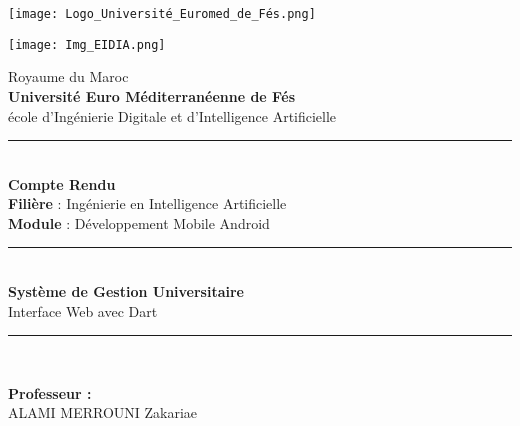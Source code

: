 \documentclass{article}
\begin{document}
\begin{titlepage}
    \begin{center}
        \begin{minipage}{0.45\textwidth}
            \texttt{[image: Logo\_Université\_Euromed\_de\_Fés.png]}
        \end{minipage}%
        \hfill
        \begin{minipage}{0.45\textwidth}
            \begin{flushright}
                \texttt{[image: Img\_EIDIA.png]}
            \end{flushright}
        \end{minipage}
    \end{center}

    \vspace*{-2.3cm}
    \begin{center}
        {\small
        Royaume du Maroc \\[0.1cm]
        \textbf{Université Euro Méditerranéenne de Fés} \\
        école d'Ingénierie Digitale et d'Intelligence Artificielle} \\[0.5cm]

        \rule{\textwidth}{0.4mm} \\[3.5cm]

        {\Huge \textbf{Compte Rendu}} \\[1.5cm]

        \Large\textbf{Filière} : Ingénierie en Intelligence Artificielle \\[0.2cm]
        \Large\textbf{Module} : Développement Mobile Android \\[3cm]

        \rule{\textwidth}{0.4mm} \\[0.7cm]
        {\huge \textbf{Système de Gestion Universitaire}} \\[0.3cm]
        {\Large Interface Web avec Dart} \\[0.5cm]
        \rule{\textwidth}{0.4mm}  \\[0.02cm]

    \end{center}

    \vspace{1.5cm}
    \noindent
    \begin{minipage}[t]{0.45\textwidth}
        \large \textbf{Professeur :} \\[0.3cm]
         ALAMI MERROUNI Zakariae \\


\end{minipage}
\end{titlepage}
\end{document}
